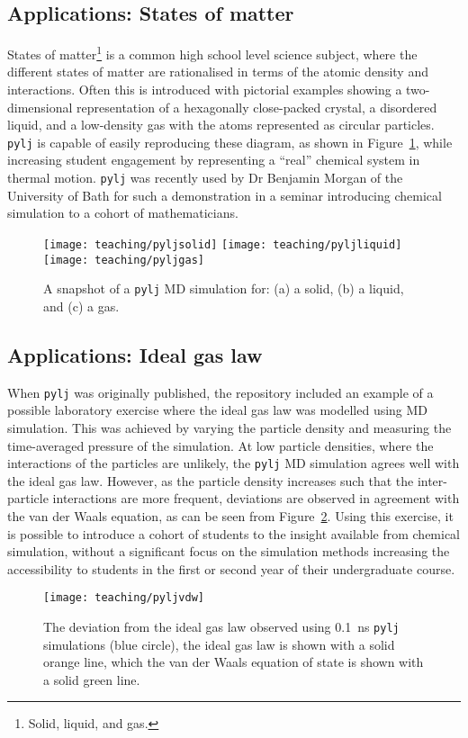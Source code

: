\subsection{Applications: States of matter}
States of matter\footnote{Solid, liquid, and gas.} is a common high school level science subject, where the different states of matter are rationalised in terms of the atomic density and interactions.
Often this is introduced with pictorial examples showing a two-dimensional representation of a hexagonally close-packed crystal, a disordered liquid, and a low-density gas with the atoms represented as circular particles.
\texttt{pylj} is capable of easily reproducing these diagram, as shown in Figure~\ref{fig:matter}, while increasing student engagement by representing a ``real'' chemical system in thermal motion.
\texttt{pylj} was recently used by Dr Benjamin Morgan of the University of Bath for such a demonstration in a seminar introducing chemical simulation to a cohort of mathematicians.
%
\begin{figure}[t]
    \centering
    \texttt{[image: teaching/pyljsolid]}
    \texttt{[image: teaching/pyljliquid]}
    \texttt{[image: teaching/pyljgas]}
    \caption{A snapshot of a \texttt{pylj} MD simulation for: (a) a solid, (b) a liquid, and (c) a gas.}
    \label{fig:matter}
\end{figure}
%

\subsection{Applications: Ideal gas law}
When \texttt{pylj} was originally published, the repository included an example of a possible laboratory exercise where the ideal gas law was modelled using MD simulation.
This was achieved by varying the particle density and measuring the time-averaged pressure of the simulation.
At low particle densities, where the interactions of the particles are unlikely, the \texttt{pylj} MD simulation agrees well with the ideal gas law.
However, as the particle density increases such that the inter-particle interactions are more frequent, deviations are observed in agreement with the van der Waals equation, as can be seen from Figure~\ref{fig:vdw}.
Using this exercise, it is possible to introduce a cohort of students to the insight available from chemical simulation, without a significant focus on the simulation methods increasing the accessibility to students in the first or second year of their undergraduate course.
%
\begin{figure}[b]
    \centering
    \texttt{[image: teaching/pyljvdw]}
    \caption{The deviation from the ideal gas law observed using \SI{0.1}{\nano\second} \texttt{pylj} simulations (blue circle), the ideal gas law is shown with a solid orange line, which the van der Waals equation of state is shown with a solid green line.}
    \label{fig:vdw}
\end{figure}
%

